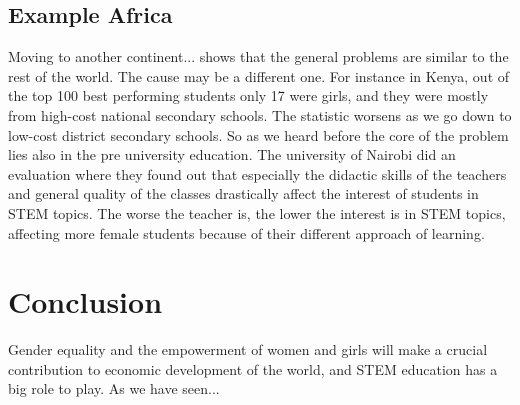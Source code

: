 	\subsection{Example Africa}
	Moving to another continent... shows that the general problems are similar to the rest of the world. The cause may be a different one.
	For instance in Kenya, out of the top 100 best performing students only 17 were girls, and they were mostly from high-cost national secondary schools. 
	The statistic worsens as we go down to low-cost district secondary schools.
	So as we heard before the core of the problem lies also in the pre university education.
	The university of Nairobi did an evaluation where they found out that especially the didactic skills of the teachers and general quality of the classes drastically affect the interest of students in STEM topics. The worse the teacher is, the lower the interest is in STEM topics, affecting more female students because of their different approach of learning.
	
	
	\section{Conclusion}
	Gender equality and the empowerment of women and girls will make a crucial contribution to economic development of the world, and STEM education has a big role to play. As we have seen...